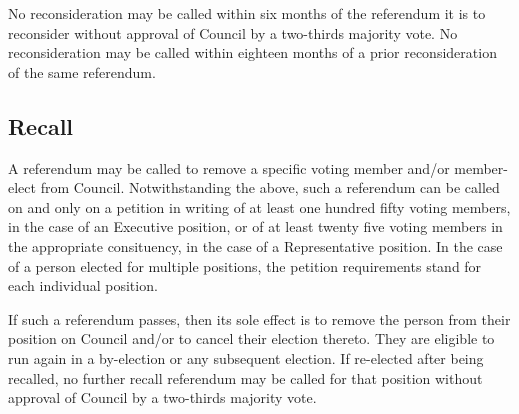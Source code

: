 No reconsideration may be called within six months of the referendum it is to
reconsider without approval of Council by a two-thirds majority vote. No
reconsideration may be called within eighteen months of a prior reconsideration
of the same referendum.

\subsection{Recall}
A referendum may be called to remove a specific voting member and/or member-elect
from Council. Notwithstanding the above, such a referendum can be called on and
only on a petition in writing of at least one hundred fifty voting members, in
the case of an Executive position, or of at least twenty five voting members in
the appropriate consituency, in the case of a Representative position. In the
case of a person elected for multiple positions, the petition requirements stand
for each individual position.

If such a referendum passes, then its sole effect is to remove the person from
their position on Council and/or to cancel their election thereto. They are
eligible to run again in a by-election or any subsequent election. If re-elected
after being recalled, no further recall referendum may be called for that
position without approval of Council by a two-thirds majority vote.
